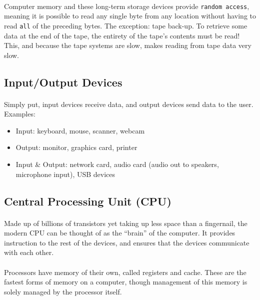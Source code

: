 \documentclass[letter,10pt]{article}
\begin{document}
\paragraph{}Computer memory and these long-term storage devices provide \texttt{random access}, meaning it is possible to read any single byte from any location without having to read \texttt{all} of the preceding bytes. The exception: tape back-up. To retrieve some data at the end of the tape, the entirety of the tape's contents must be read! This, and because the tape systems are slow, makes reading from tape data very slow.

\subsection{Input/Output Devices}
\paragraph{}Simply put, input devices receive data, and output devices send data to the user. Examples:
\begin{itemize}
    \item Input: keyboard, mouse, scanner, webcam
    \item Output: monitor, graphics card, printer
    \item Input \& Output: network card, audio card (audio out to speakers, microphone input), USB devices
\end{itemize}

\subsection{Central Processing Unit (CPU)}
\paragraph{}Made up of billions of transistors yet taking up less space than a fingernail, the modern CPU can be thought of as the ``brain'' of the computer. It provides instruction to the rest of the devices, and ensures that the devices communicate with each other.

\paragraph{}Processors have memory of their own, called registers and cache. These are the fastest forms of memory on a computer, though management of this memory is solely managed by the processor itself.
\end{document}
